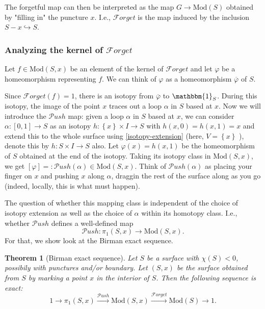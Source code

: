 \documentclass[reqno]{amsart}
\newtheorem{theorem}{Theorem}[section]
\theoremstyle{definition}
\theoremstyle{remark}
\newcommand{\Mod}{{\mathrm{Mod}}}
\newcommand{\Push}{{\mathcal{P}}ush}
\newcommand{\Forget}{{\mathcal{F}}orget}
\begin{document}
The forgetful map can then be interpreted
as the map $G \to \Mod(S)$ obtained by "filling in" the
puncture $x$. I.e., $\Forget$ is the map
induced by the inclusion
 $S -x \hookrightarrow S$.



 

 \subsubsection{Analyzing the kernel of $\Forget$}

 Let $f \in \Mod(S,x)$ be an element of the kernel
 of $\Forget$ and let  $\varphi $ be a homeomorphism
 representing $f$. We can think of
 $\varphi $ as a homeomorphism $\overline{\varphi}$ of
 $S$.

 Since $\Forget (f) = 1$, there is an isotopy
 from $\overline{\varphi }$ to $\mathbbm{1}_S$. During
 this isotopy, the image of the point $x$ traces out a
 loop $\alpha$ in $S$ based at $x$. Now
 we will introduce the $\Push$ map:
 given a loop $\alpha$ in $S$ based at $x$, we can
 consider $\alpha \colon \left[ 0,1 \right] \to S$ as
 an isotopy $h \colon \left\{ x \right\} \times I
 \to S$ with $h(x,0) = h(x,1) = x$ and extend this
 to the whole surface using \ref{isotopy-extension} (here,
 $V = \left\{ x \right\} $ ), denote this by
 $h \colon S \times I \to S$ also. Let
 $\varphi (x) = h(x,1) $ be the homeomorphism
 of $S$ obtained at the end of the isotopy. Taking its
 isotopy class in $\Mod \left( S,x \right) $, we get
 $\left[ \varphi  \right] = : 
 \Push(\alpha) \in \Mod\left( S,x \right) $.
 Think of $\Push(\alpha)$ as placing your finger on
 $x$ and pushing $x$ along $\alpha$, draggin the
 rest of the surface along as you go (indeed, locally,
 this is what must happen).

 The question of whether this mapping class
 is independent of the choice of isotopy extension
 as well as the choice of $\alpha$ within its homotopy class.
 I.e., whether $\Push$ defines a 
 well-defined map
 \[
 \Push \colon \pi_1 \left( S,x \right) 
 \to \Mod \left( S,x \right) .
 \] 
 For that, we show look at the
 Birman exact sequence.






 \begin{theorem}[Birman exact sequence]
     Let $S$ be a surface with $\chi (S) < 0$, possibily
     with punctures and/or boundary. Let
     $\left( S, x \right) $ be the surface
     obtained from $S$ by marking a point $x$ in
     the interior of $S$. Then the following
     sequence is exact:
     \[
         1 \to \pi_1 \left( S, x \right) \stackrel{\Push}{\to }
         \Mod \left( S, x \right) 
         \stackrel{\Forget}{\to } \Mod(S) \to 1.
     \] 
 \end{theorem}
\end{document}
